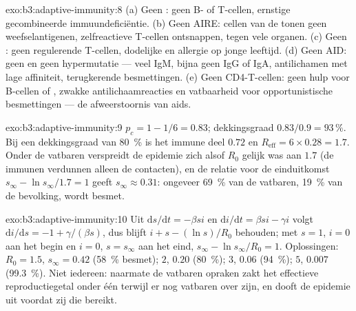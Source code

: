 \begin{solution}{exo:b3:adaptive-immunity:8}
(a) Geen : geen B- of T-cellen, ernstige
gecombineerde immuundeficiëntie. (b) Geen AIRE: cellen van de 
tonen geen weefselantigenen, zelfreactieve T-cellen ontsnappen,
 tegen vele organen. (c) Geen : geen regulerende
T-cellen, dodelijke  en allergie op jonge leeftijd.
(d) Geen AID: geen  en geen hypermutatie --- veel IgM,
bijna geen IgG of IgA, antilichamen met lage affiniteit, terugkerende
besmettingen. (e) Geen CD4-T-cellen: geen hulp voor B-cellen of
, zwakke antilichaamreacties en vatbaarheid voor
opportunistische besmettingen --- de afweerstoornis van aids.
\end{solution}

\begin{solution}{exo:b3:adaptive-immunity:9}
$p_{c} = 1 - 1/6 = 0.83$; dekkingsgraad $0.83/0.9 = 93\,\%$. Bij een
dekkingsgraad van \qty{80}{\%} is het immune deel $0.72$ en
$R_{\text{eff}} = 6\times 0.28
= 1.7$. Onder de vatbaren verspreidt de epidemie zich alsof $R_{0}$
gelijk was aan $1.7$ (de immunen verdunnen alleen de contacten), en de
relatie voor de einduitkomst $s_{\infty} - \ln s_{\infty}/1.7 = 1$
geeft $s_{\infty}
\approx 0.31$: ongeveer \qty{69}{\%} van de vatbaren, \qty{19}{\%} van
de bevolking, wordt besmet.
\end{solution}

\begin{solution}{exo:b3:adaptive-immunity:10}
Uit $\mathrm{d}s/\mathrm{d}t = -\beta si$ en $\mathrm{d}i/\mathrm{d}t
= \beta si - \gamma i$ volgt $\mathrm{d}i/\mathrm{d}s = -1 + \gamma/(\beta s)$,
dus blijft $i + s - (\ln s)/R_{0}$ behouden; met $s = 1$, $i = 0$ aan
het begin en $i = 0$, $s = s_{\infty}$ aan het eind, $s_{\infty} - \ln
s_{\infty}/R_{0} = 1$. Oplossingen: $R_{0} = 1.5$, $s_{\infty} = 0.42$
(\qty{58}{\%} besmet); $2$, $0.20$ (\qty{80}{\%}); $3$, $0.06$
(\qty{94}{\%}); $5$, $0.007$ (\qty{99.3}{\%}). Niet iedereen: naarmate
de vatbaren opraken zakt het effectieve reproductiegetal onder één
terwijl er nog vatbaren over zijn, en dooft de epidemie uit voordat zij
die bereikt.
\end{solution}

